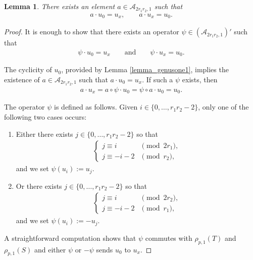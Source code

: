 \documentclass[pdftex]{sigma}
\numberwithin{equation}{section}
\newtheorem{Lemma}[Theorem]{Lemma}
\begin{document}
\begin{Lemma}\label{lemmalacon}
There exists an element $a \in \mathcal{A}_{2r_1r_2,1}$ such that
\begin{gather*}
a\cdot u_0 = u_x, \qquad a \cdot u_x = u_0.
\end{gather*}
\end{Lemma}

\begin{proof} It is enough to show that there exists an operator $\psi \in (\mathcal{A}_{2r_1r_2,1})'$ such that
\begin{gather*} \psi \cdot u_0 = u_x \qquad \text{and} \qquad \psi \cdot u_x =u_0.\end{gather*}

The cyclicity of $u_0$, provided by Lemma \ref{lemma_genusone1}, implies the existence of $a\in\mathcal{A}_{2r_1r_2,1}$ such that
$a\cdot u_0 = u_x$. If such a $\psi$ exists, then
\begin{gather*} a\cdot u_x = a \circ \psi \cdot u_0 = \psi \circ a \cdot u_0 = u_0.\end{gather*}

The operator $\psi$ is defined as follows. Given $i\in \{0, \ldots, r_1r_2-2\}$, only one of the following two cases occurs:
\begin{enumerate}\itemsep=0pt
\item Either there exists $j\in\{0, \ldots, r_1r_2-2 \}$ so that
\begin{gather*} \begin{cases}
j\equiv i & \pmod{2r_1}, \\
j\equiv -i-2 & \pmod{r_2},
\end{cases}\end{gather*}
 and we set $\psi(u_i):=u_j$.
\item Or there exists $j\in\{0, \ldots, r_1r_2-2 \}$ so that
\begin{gather*} \begin{cases}
j\equiv i & \pmod{2r_2}, \\
j\equiv -i-2& \pmod{r_1},
\end{cases}\end{gather*}
 and we set $\psi(u_i):=-u_j$.
\end{enumerate}
A straightforward computation shows that $\psi$ commutes with $\rho_{p,1}(T)$ and $\rho_{p,1}(S)$ and either $\psi$ or $-\psi$ sends $u_0$ to $u_x$.
\end{proof}
\end{document}

